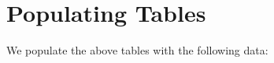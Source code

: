 \section{Populating Tables}

We populate the above tables with the following data:

\inputminted{text}{data.txt}

